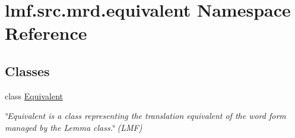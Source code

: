 \hypertarget{namespacelmf_1_1src_1_1mrd_1_1equivalent}{\section{lmf.\+src.\+mrd.\+equivalent Namespace Reference}
\label{namespacelmf_1_1src_1_1mrd_1_1equivalent}
}
\subsection*{Classes}
\begin{DoxyCompactItemize}
\item 
class \hyperlink{classlmf_1_1src_1_1mrd_1_1equivalent_1_1_equivalent}{Equivalent}
\begin{DoxyCompactList}\small\item\em \char`\"{}\+Equivalent is a class representing the translation equivalent of the word form managed by the Lemma class.\char`\"{} (L\+M\+F) \end{DoxyCompactList}\end{DoxyCompactItemize}

